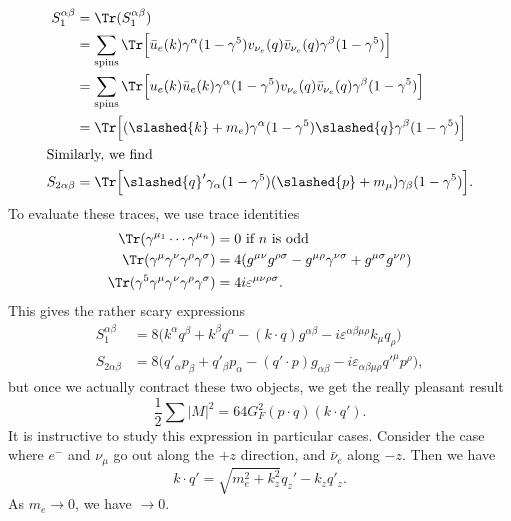 \documentclass[a4paper]{article}
\begin{document}
\begin{align*}
  S_1^{\alpha\beta} &= \Tr(S_1^{\alpha\beta}) \\
  &= \sum_{\mathrm{spins}} \Tr \Big[\bar{u}_e(k) \gamma^\alpha (1 - \gamma^5) v_{\nu_e}(q) \bar{v}_{\nu_e}(q) \gamma^\beta (1 - \gamma^5)\Big]\\
  &= \sum_{\mathrm{spins}} \Tr \Big[u_e(k)\bar{u}_e(k) \gamma^\alpha (1 - \gamma^5) v_{\nu_e}(q) \bar{v}_{\nu_e}(q) \gamma^\beta (1 - \gamma^5)\Big]\\
  &= \Tr \Big[(\slashed{k} + m_e) \gamma^\alpha (1 - \gamma^5) \slashed{q} \gamma^\beta(1 - \gamma^5)\Big]\\
  \intertext{Similarly, we find}
  S_{2\alpha\beta} &= \Tr \Big[\slashed{q}' \gamma_\alpha(1 - \gamma^5) (\slashed{p} + m_\mu) \gamma_\beta(1 - \gamma^5)\Big].
\end{align*}
To evaluate these traces, we use trace identities
\begin{align*}
  \Tr(\gamma^{\mu_1} \cdots \gamma^{\mu_n}) &= 0\text{ if $n$ is odd}\\
  \Tr(\gamma^\mu \gamma^\nu \gamma^\rho \gamma^\sigma) &= 4 (g^{\mu\nu} g^{\rho\sigma} - g^{\mu\rho} \gamma^{\nu\sigma} + g^{\mu\sigma} g^{\nu\rho})\\
  \Tr(\gamma^5 \gamma^\mu \gamma^\nu \gamma^\rho \gamma^\sigma) &= 4i \varepsilon^{\mu\nu\rho\sigma}.
\end{align*}
This gives the rather scary expressions
\begin{align*}
  S_1^{\alpha\beta} &= 8\Big(k^\alpha q^\beta + k^\beta q^\alpha - (k\cdot q) g^{\alpha\beta} - i \varepsilon^{\alpha\beta\mu\rho} k_\mu q_\rho\Big)\\
  S_{2\alpha\beta} &= 8\Big(q'_\alpha p_\beta + q'_\beta p_\alpha - (q' \cdot p) g_{\alpha\beta} - i \varepsilon_{\alpha\beta\mu\rho} q'^\mu p^\rho\Big),
\end{align*}
but once we actually contract these two objects, we get the really pleasant result
\[
  \frac{1}{2} \sum |M|^2 = 64 G_F^2 (p \cdot q)(k \cdot q').
\]
It is instructive to study this expression in particular cases. Consider the case where $e^-$ and $\nu_\mu$ go out along the $+z$ direction, and $\bar{\nu}_e$ along $-z$. Then we have
\[
  k \cdot q' = \sqrt{m_e^2 + k_z^2} q_z' - k_z q'_z.
\]
As $m_e \to 0$, we have $\to 0$.
\end{document}
